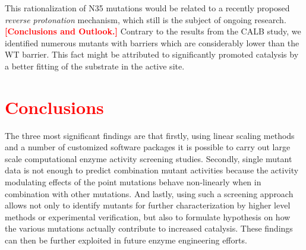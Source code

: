 This rationalization of N35 mutations would be related to a recently proposed \textit{reverse protonation} mechanism\cite{joshi2000hydrogen}, which still is the subject of ongoing research.\\
\textcolor{red}{\textbf{[Conclusions and Outlook.]}}
Contrary to the results from the CALB study, we identified numerous mutants with barriers which are considerably lower than the WT barrier.
This fact might be attributed to significantly promoted catalysis by a better fitting of the substrate in the active site.




\clearpage
\section{\textcolor{red}{Conclusions}}\label{sec:conclusions}
The three most significant findings are that firstly, using linear scaling methods and a number of customized software packages it is possible to carry out large scale computational enzyme activity screening studies.
Secondly, single mutant data is not enough to predict combination mutant activities because the activity modulating effects of the point mutations behave non-linearly when in combination with other mutations.
And lastly, using such a screening approach allows not only to identify mutants for further characterization by higher level methods or experimental verification, but also to formulate hypothesis on how the various mutations actually contribute to increased catalysis.
These findings can then be further exploited in future enzyme engineering efforts.
